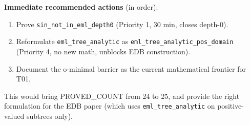 \documentclass[12pt]{article}
\theoremstyle{definition}
\begin{document}
\textbf{Immediate recommended actions} (in order):
\begin{enumerate}
  \item Prove \texttt{sin\_not\_in\_eml\_depth0} (Priority 1, 30 min, closes depth-0).
  \item Reformulate \texttt{eml\_tree\_analytic} as \texttt{eml\_tree\_analytic\_pos\_domain}
        (Priority 4, no new math, unblocks EDB construction).
  \item Document the o-minimal barrier as the current mathematical frontier for T01.
\end{enumerate}

This would bring PROVED\_COUNT from 24 to 25, and provide the right formulation for
the EDB paper (which uses \texttt{eml\_tree\_analytic} on positive-valued subtrees only).
\end{document}
